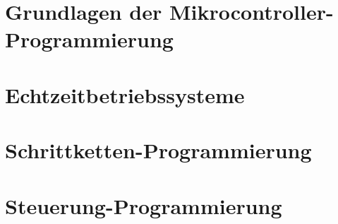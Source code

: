 \section{Grundlagen der Mikrocontroller-Programmierung}

\section{Echtzeitbetriebssysteme}

\section{Schrittketten-Programmierung}

\section{Steuerung-Programmierung}